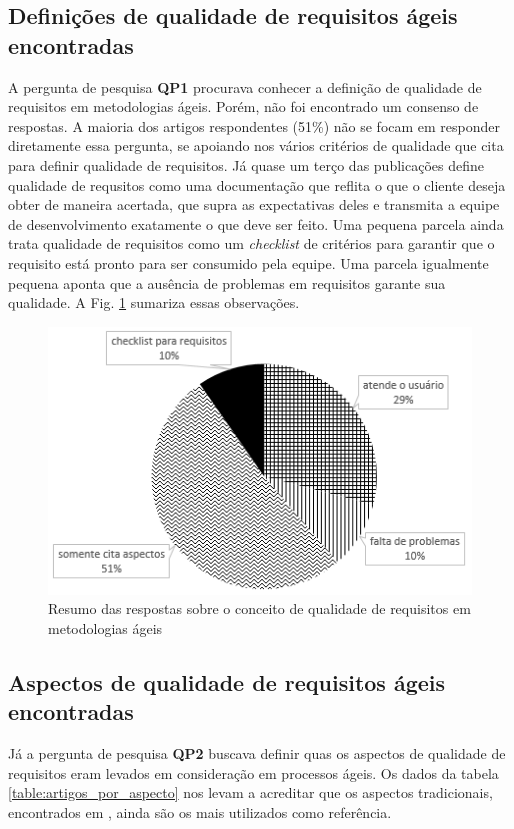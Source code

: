 \subsection{Definições de qualidade de requisitos ágeis encontradas}

A pergunta de pesquisa \textbf{QP1} procurava conhecer a definição de qualidade de requisitos em metodologias ágeis. Porém, não foi encontrado um consenso de respostas. A maioria dos artigos respondentes (51\%) não se focam em responder diretamente essa pergunta, se apoiando nos vários critérios de qualidade que cita para definir qualidade de requisitos. Já quase um terço das publicações define qualidade de requsitos como uma documentação que reflita o que o cliente deseja obter de maneira acertada, que supra as expectativas deles e transmita a equipe de desenvolvimento exatamente o que deve ser feito. Uma pequena parcela ainda trata qualidade de requisitos como um \textit{checklist} de critérios para garantir que o requisito está pronto para ser consumido pela equipe. Uma parcela igualmente pequena aponta que a ausência de problemas em requisitos garante sua qualidade. A Fig. \ref{fig:respostas_qp1} sumariza essas observações.

\begin{figure}[!h]
\captionsetup{justification=centering}
\centering
\includegraphics[scale=0.7]{images/Respostas_QP1}
\caption{Resumo das respostas sobre o conceito de qualidade de requisitos em metodologias ágeis}
\label{fig:respostas_qp1}
\end{figure}

\subsection{Aspectos de qualidade de requisitos ágeis encontradas}

Já a pergunta de pesquisa \textbf{QP2} buscava definir quas os aspectos de qualidade de requisitos eram levados em consideração em processos ágeis. Os dados da tabela \ref{table:artigos_por_aspecto} nos levam a acreditar que os aspectos tradicionais, encontrados em \cite{Babok_2015}, ainda são os mais utilizados como referência. 

